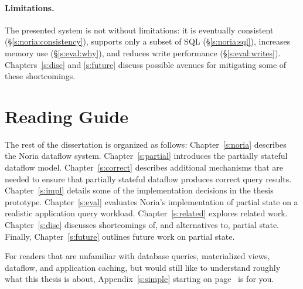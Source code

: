 \paragraph{Limitations.}
The presented system is not without limitations: it is eventually consistent
(\S\ref{s:noria:consistency}), supports only a subset of SQL
(\S\ref{s:noria:sql}), increases memory use (\S\ref{s:eval:why}), and reduces
write performance (\S\ref{s:eval:writes}). Chapters~\ref{s:disc} and
\ref{s:future} discuss possible avenues for mitigating some of these
shortcomings.

\section{Reading Guide}
\label{s:read}

The rest of the dissertation is organized as follows: Chapter~\ref{s:noria}
describes the Noria dataflow system. Chapter~\ref{s:partial} introduces the
partially stateful dataflow model. Chapter~\ref{s:correct} describes additional
mechanisms that are needed to ensure that partially stateful dataflow produces
correct query results. Chapter~\ref{s:impl} details some of the implementation
decisions in the thesis prototype. Chapter~\ref{s:eval} evaluates Noria's
implementation of partial state on a realistic application query workload.
Chapter~\ref{s:related} explores related work. Chapter~\ref{s:disc} discusses
shortcomings of, and alternatives to, partial state. Finally,
Chapter~\ref{s:future} outlines future work on partial state.

For readers that are unfamiliar with database queries, materialized views,
dataflow, and application caching, but would still like to understand roughly
what this thesis is about, Appendix~\ref{s:simple} starting on
page~\pageref{s:simple} is for you.
